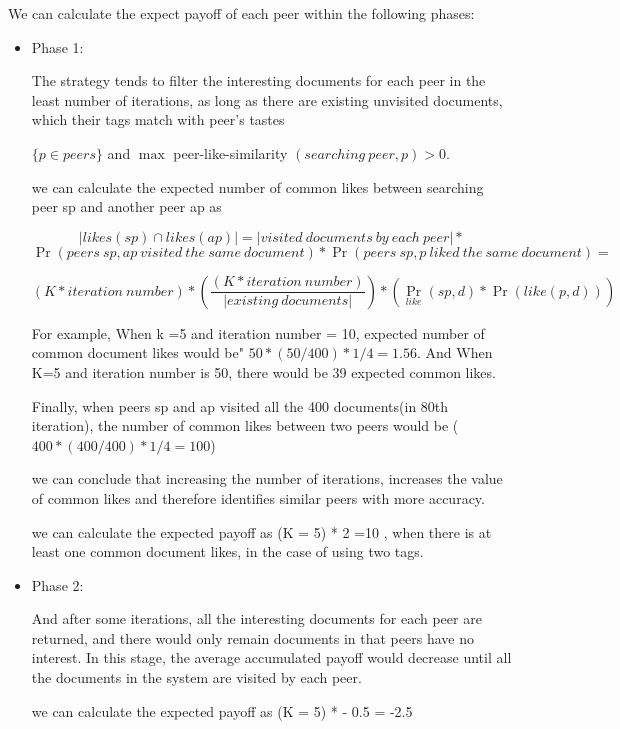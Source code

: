 \documentclass [12pt]{article} \usepackage{multicol}
\begin{document}
We can calculate the expect payoff of each peer within the following phases:

\begin{itemize} 
\item Phase 1:

The strategy tends to filter the interesting documents for each peer in 
the least number of iterations, as long as there are existing unvisited documents, which their tags match with peer's tastes  


$ \{p \in peers \}$ and   $ \max $ peer-like-similarity
$(searching\ peer, p)  > 0.$

we can calculate the expected number of common likes between
searching peer sp and another peer ap as

$$ |likes(sp) \cap likes(ap)| =   | visited\ documents \ by\ each\ peer| * $$ 
$$ \Pr({peers\ sp, ap\ visited\ the\ same\ document})  * \Pr({peers\ sp,p\ liked\ the\ same\ document }) = $$

$$ ( K * {iteration\ number} ) *  (\frac {(K * {iteration\ number} )} {| existing\ documents|}) * (\Pr_{like}(sp, d) *
\Pr({like(p, d)})) $$

For example, When k =5 and iteration number = 10, expected number of common document likes
would be" $50  * ( 50/400) * 1/4 = 1.56 $. And  When K=5 and iteration number is 50, there would be 39 expected common likes.

Finally, when peers sp and ap visited all the 400 documents(in 80th iteration), the number of common likes
between two peers would be ($ 400  * ( 400/400) * 1/4 = 100 $)
  
we can conclude that increasing the number of iterations, increases the value of common likes and therefore identifies similar peers with
more accuracy. 

%
we can calculate the expected payoff as (K = 5) * 2 =10 , when there is at least one common document likes, in the case of using two tags.    	


\item Phase 2: 

And after some iterations, all the interesting documents for each peer are returned,
and there would only remain documents in that peers have no interest. In this stage, the average accumulated payoff would 
decrease until all the documents in the system are visited by each peer. 

we can calculate the expected payoff as (K = 5) * - 0.5  = -2.5   	
\end{itemize} 
\end{document}
